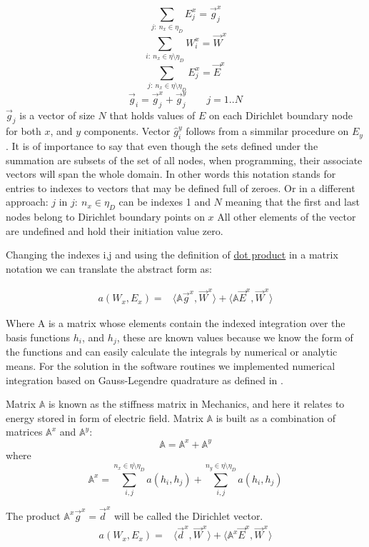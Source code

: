 $$\sum_{j:\ n_x \in \eta_D}E_j^x = \vec{g}_j^x $$
$$\sum_{i:\ n_x \in \eta\setminus\eta_D}W_i^x = \vec{W}^x $$
$$\sum_{j:\ n_x \in \eta\setminus\eta_D}E_j^x = \vec{E}^x $$
$$\vec{g}_i = \vec{g}_j^x+\vec{g}_j^y \qquad j = 1.. N$$
$\vec{g}_j$ is a vector of size $N$ that holds values of $E$ on each Dirichlet boundary node for both $x$, and $y$ components. Vector $\hat{g}_i^y$ follows from a simmilar procedure on $E_y$. It is of importance to say that even though the sets defined under the summation are subsets of the set of all nodes, when programming, their associate vectors will span the whole domain. In other words this notation stands for entries to indexes to vectors that may be defined full of zeroes. Or in a different approach: $j$ in $j:\ n_x \in \eta_D$ can be indexes 1 and $N$ meaning that the first and last nodes belong to Dirichlet boundary points on $x$ All other elements of the vector are undefined and hold their initiation value zero.


Changing the indexes i,j and using the definition of \href{http://en.wikipedia.org/wiki/Dot_product}{dot product} in a matrix notation we can translate the abstract form as:

\begin{align*}
a\left(W_x,E_x\right)=&\langle \mathbb{A}\vec{g}^x,\vec{W}^x\rangle
+\langle\mathbb{A}\vec{E}^x,\vec{W}^x\rangle  
\end{align*}

Where A is a matrix whose elements contain the indexed integration over the basis functions $h_i$, and $h_j$, these are known values because we know the form of the functions and can easily calculate the integrals by numerical or analytic means. For the solution in the software routines we implemented numerical integration based on Gauss-Legendre quadrature as defined in \cite{Bathe1996}. 

Matrix $\mathbb{A}$ is known as the stiffness matrix in Mechanics, and here it relates to energy stored in form of electric field. Matrix $\mathbb{A}$ is built as a combination of matrices $\mathbb{A}^x$ and $\mathbb{A}^y$:
$$\mathbb{A} = \mathbb{A}^x+\mathbb{A}^y$$
where
$$\mathbb{A}^x = \sum_{i,j}^{n_x \in \eta\setminus\eta_D} a(h_i,h_j)+\sum_{i,j}^{n_y \in \eta\setminus\eta_D} a(h_i,h_j)$$

The product $\mathbb{A}^x\vec{g}^x = \vec{d}^x$ will be called the Dirichlet vector.
\begin{align}
a\left(W_x,E_x\right)=&\langle \vec{d}^x,\vec{W}^x\rangle
+\langle\mathbb{A}^x\vec{E}^x,\vec{W}^x\rangle \label{eq:potential_discrete} 
\end{align}

